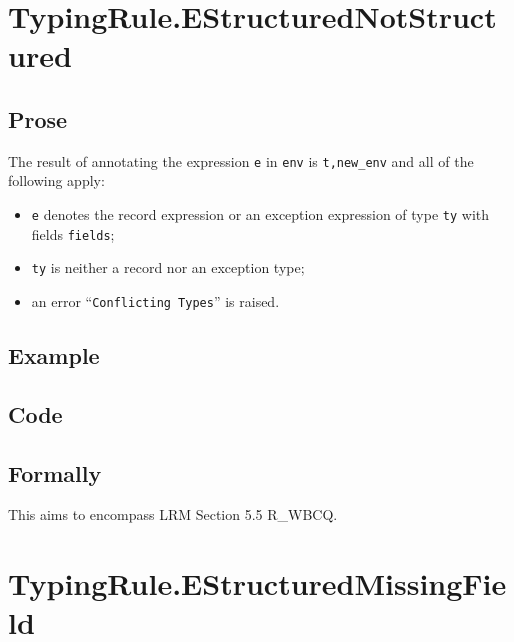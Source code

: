 \documentclass{book}
\begin{document}
\section{TypingRule.EStructuredNotStructured \label{sec:TypingRule.EStructuredNotStructured}}

  \subsection{Prose}
  The result of annotating the expression \texttt{e} in \texttt{env} is
\texttt{t,new\_env} and all of the following apply:
  \begin{itemize}
  \item \texttt{e} denotes the record expression or an exception expression of type \texttt{ty} with fields \texttt{fields};
  \item \texttt{ty} is neither a record nor an exception type;
  \item an error ``\texttt{Conflicting Types}'' is raised.
  \end{itemize}

  \subsection{Example}

  \subsection{Code}

\begin{emptyformal}
    \subsection{Formally}
\end{emptyformal}


  This aims to encompass LRM Section 5.5 R\_WBCQ.

\section{TypingRule.EStructuredMissingField \label{sec:TypingRule.EStructuredMissingField}}
\end{document}
